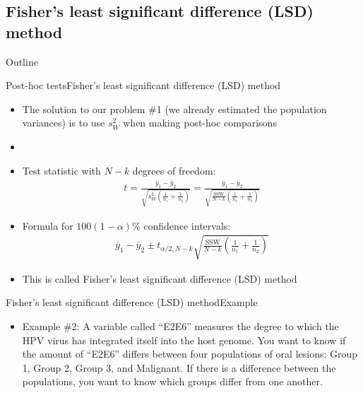 \documentclass[xcolor=dvipsnames]{beamer}
\begin{document}
\subsection{Fisher's least significant difference (LSD) method}

\begin{frame}{Outline}
	\tableofcontents[currentsection,subsectionstyle=show/shaded/hide]
\end{frame}

\begin{frame}{Post-hoc tests}{Fisher's least significant difference (LSD) method}
	\begin{itemize}
		\item The solution to our problem \#1 (we already estimated the population variances) is to use $s^2_W$ when making post-hoc comparisons
		\item[]
		\item Test statistic with $N-k$ degrees of freedom:
		\begin{gather*}
			t = \frac{\bar{y}_1 - \bar{y}_2}{\sqrt{s^2_W\left(\frac{1}{n_1}+\frac{1}{n_2}\right)}} = \frac{\bar{y}_1 - \bar{y}_2}{\sqrt{\frac{\text{SSW}}{N-k} \left(\frac{1}{n_1}+\frac{1}{n_2}\right)}}
		\end{gather*}
		\item Formula for $100(1-\alpha)\%$ confidence intervals:
		\begin{gather*}
			\bar{y}_1 - \bar{y}_2 \pm t_{\alpha / 2, N - k}{\sqrt{\frac{\text{SSW}}{N-k} \left(\frac{1}{n_1}+\frac{1}{n_2}\right)}}
		\end{gather*}
		\item This is called Fisher's least significant difference (LSD) method
	\end{itemize}
\end{frame}

\begin{frame}{Fisher's least significant difference (LSD) method}{Example}
	\begin{itemize}
		\item Example \#2: A variable called ``E2E6'' measures the degree to which the HPV virus has integrated itself into the host genome. You want to know if the amount of ``E2E6'' differs between four populations of oral lesions: Group 1, Group 2, Group 3, and Malignant. If there is a difference between the populations, you want to know which groups differ from one another.
	\end{itemize}
\end{frame}      
\end{document}

